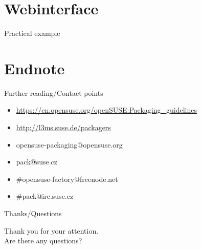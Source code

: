 \documentclass{beamer}
\begin{document}
\section{Webinterface}

\begin{frame}{Practical example}
\end{frame}

\section{Endnote}

\begin{frame}[t]{Further reading/Contact points}
	\begin{itemize}
	\item \url{https://en.opensuse.org/openSUSE:Packaging\_guidelines}
	\item \url{http://l3ms.suse.de/packagers}
	\item opensuse-packaging@opensuse.org
	\item pack@suse.cz
	\item \#opensuse-factory@freenode.net 
	\item \#pack@irc.suse.cz
	\end{itemize}
\end{frame}

\begin{frame}{Thanks/Questions}
	\begin{center}
	Thank you for your attention.\\
	Are there any questions?
	\end{center}
\end{frame}
\end{document}
